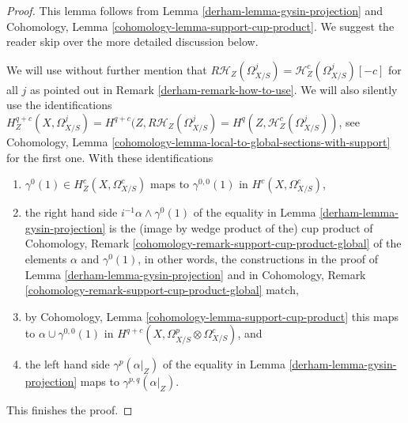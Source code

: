 \begin{proof}

This lemma follows from Lemma \ref{derham-lemma-gysin-projection}
and Cohomology, Lemma \ref{cohomology-lemma-support-cup-product}.
We suggest the reader skip over the more detailed discussion below.

\medskip\noindent
We will use without further mention that
$R\mathcal{H}_Z(\Omega^j_{X/S}) = \mathcal{H}^c_Z(\Omega^j_{X/S})[-c]$
for all $j$ as pointed out in Remark \ref{derham-remark-how-to-use}.
We will also silently use the identifications
$H^{q + c}_Z(X, \Omega^j_{X/S}) = H^{q + c}(Z, R\mathcal{H}_Z(\Omega^j_{X/S}) =
H^q(Z, \mathcal{H}^c_Z(\Omega^j_{X/S}))$, see
Cohomology, Lemma \ref{cohomology-lemma-local-to-global-sections-with-support}
for the first one. With these identifications
\begin{enumerate}
\item $\gamma^0(1) \in H^c_Z(X, \Omega^c_{X/S})$ maps to $\gamma^{0, 0}(1)$
in $H^c(X, \Omega^c_{X/S})$,
\item the right hand side $i^{-1}\alpha \wedge \gamma^0(1)$
of the equality in Lemma \ref{derham-lemma-gysin-projection}
is the (image by wedge product of the) cup product of
Cohomology, Remark \ref{cohomology-remark-support-cup-product-global}
of the elements $\alpha$ and $\gamma^0(1)$, in other words, the constructions
in the proof of Lemma \ref{derham-lemma-gysin-projection} and in
Cohomology, Remark \ref{cohomology-remark-support-cup-product-global} match,
\item by Cohomology, Lemma \ref{cohomology-lemma-support-cup-product}
this maps to $\alpha \cup \gamma^{0, 0}(1)$ in
$H^{q + c}(X, \Omega^p_{X/S} \otimes \Omega^c_{X/S})$, and
\item the left hand side $\gamma^p(\alpha|_Z)$ of the equality in
Lemma \ref{derham-lemma-gysin-projection} maps to
$\gamma^{p, q}(\alpha|_Z)$.
\end{enumerate}
This finishes the proof.
\end{proof}

